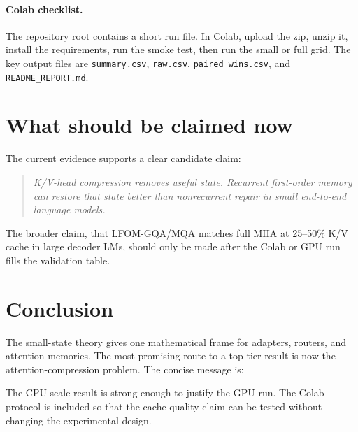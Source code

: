 \documentclass[10pt,twocolumn]{article}
\begin{document}
\paragraph{Colab checklist.} The repository root contains a short run file. In Colab, upload the zip, unzip it, install the requirements, run the smoke test, then run the small or full grid. The key output files are \texttt{summary.csv}, \texttt{raw.csv}, \texttt{paired\_wins.csv}, and \texttt{README\_REPORT.md}.

\section{What should be claimed now}
The current evidence supports a clear candidate claim:
\begin{quote}
\emph{K/V-head compression removes useful state. Recurrent first-order memory can restore that state better than nonrecurrent repair in small end-to-end language models.}
\end{quote}
The broader claim, that LFOM-GQA/MQA matches full MHA at 25--50\% K/V cache in large decoder LMs, should only be made after the Colab or GPU run fills the validation table.

\section{Conclusion}
The small-state theory gives one mathematical frame for adapters, routers, and attention memories. The most promising route to a top-tier result is now the attention-compression problem. The concise message is:
\begin{center}
\end{center}
The CPU-scale result is strong enough to justify the GPU run. The Colab protocol is included so that the cache-quality claim can be tested without changing the experimental design.
\end{document}
